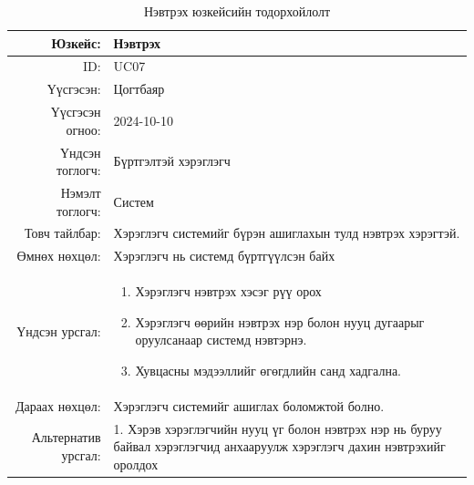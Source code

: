 \begin{longtable}{|r|p{11.5cm}|}
    \caption{Нэвтрэх юзкейсийн тодорхойлолт} 
    \label{table:songolt4}\\ \hline
    {Юзкейс:} & {Нэвтрэх}\\ \hline
    {ID:} & {UC07}\\ \hline
    {Үүсгэсэн:} & {Цогтбаяр}\\ \hline
    {Үүсгэсэн огноо:} & {2024-10-10}\\ \hline
    {Үндсэн тоглогч:} & {Бүртгэлтэй хэрэглэгч}\\ \hline
    {Нэмэлт тоглогч:} & {Систем}\\ \hline
    {Товч тайлбар:} & {Хэрэглэгч системийг бүрэн ашиглахын тулд нэвтрэх хэрэгтэй.}\\ \hline
    {Өмнөх нөхцөл:} & {Хэрэглэгч нь системд бүртгүүлсэн байх}\\ \hline
    {Үндсэн урсгал:} & {\begin{enumerate}
        \item Хэрэглэгч нэвтрэх хэсэг рүү орох
    \item Хэрэглэгч өөрийн нэвтрэх нэр болон нууц дугаарыг оруулсанаар системд нэвтэрнэ.
    \item Хувцасны мэдээллийг өгөгдлийн санд хадгална.\end{enumerate}}\\ \hline
    {Дараах нөхцөл:} & {Хэрэглэгч системийг ашиглах боломжтой болно.}\\ \hline
    {Альтернатив урсгал:} & {1. Хэрэв хэрэглэгчийн нууц үг болон нэвтрэх нэр нь буруу байвал хэрэглэгчид анхааруулж хэрэглэгч дахин нэвтрэхийг оролдох}\\ \hline
\end{longtable}
\newpage
